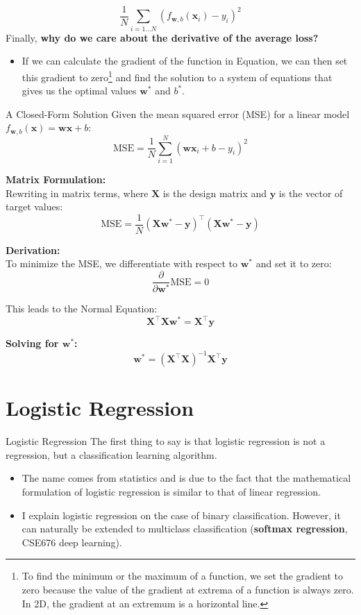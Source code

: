 \documentclass[9pt,dvipsnames]{beamer}
\begin{document}
\begin{frame}
	$$
	\frac{1}{N} \sum_{i=1 \ldots N}\left(f_{\mathbf{w}, b}\left(\mathbf{x}_{i}\right)-y_{i}\right)^{2}
	$$
	Finally, \textbf{why do we care about the derivative of the average loss?} 
	\begin{itemize}
		\item 	If we can calculate the gradient of the function in Equation, we can then set this gradient to zero\footnote{To find the minimum or the maximum of a function, we set the gradient to zero because the value of the gradient at extrema of a function is always zero. In 2D, the gradient at an extremum is a horizontal line.} and find the solution to a system of equations that gives us the optimal values $\mathbf{w}^{*}$ and $b^{*}$.
	\end{itemize}
	
\end{frame}
\begin{frame}{A Closed-Form Solution}
	Given the mean squared error (MSE) for a linear model \( f_{\mathbf{w}, b}(\mathbf{x}) = \mathbf{w} \mathbf{x} + b \):
	\[ \text{MSE} = \frac{1}{N} \sum_{i=1}^{N} (\mathbf{w} \mathbf{x}_i + b - y_i)^2 \]
	
	\textbf{Matrix Formulation:} \\
	Rewriting in matrix terms, where \( \mathbf{X} \) is the design matrix and \( \mathbf{y} \) is the vector of target values:
	\[ \text{MSE} = \frac{1}{N} (\mathbf{X}\mathbf{w}^{*} - \mathbf{y})^\top (\mathbf{X}\mathbf{w}^{*} - \mathbf{y}) \]
	
	\textbf{Derivation:} \\
	To minimize the MSE, we differentiate with respect to \( \mathbf{w}^{*} \) and set it to zero:
	\[ \frac{\partial}{\partial \mathbf{w}^{*}} \text{MSE} = 0 \]
	
	This leads to the Normal Equation:
	\[ \mathbf{X}^\top \mathbf{X}\mathbf{w}^{*} = \mathbf{X}^\top \mathbf{y} \]
	
	\textbf{Solving for \( \mathbf{w}^{*} \):} \\
	\[ \mathbf{w}^{*} = (\mathbf{X}^\top \mathbf{X})^{-1} \mathbf{X}^\top \mathbf{y} \]
\end{frame}

\section{Logistic Regression}
\begin{frame}{Logistic Regression}
	The first thing to say is that logistic regression is not a regression, but a classification learning algorithm. 
	\begin{itemize}
		\item The name comes from statistics and is due to the fact that the mathematical formulation of logistic regression is similar to that of linear regression.
		\item I explain logistic regression on the case of binary classification. However, it can naturally be extended to multiclass classification (\textbf{softmax regression}, CSE676 deep learning).
	\end{itemize}
\end{frame}
\end{document}
